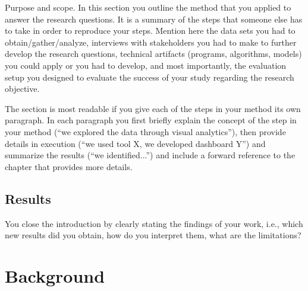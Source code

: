 \documentclass[12pt,a4paper,footinclude=true,twoside,headinclude=true]{report}
\begin{document}
\textsf{Purpose and scope}. In this section you outline the method that you applied to answer the research questions. It is a summary of the steps that someone else has to take in order to reproduce your steps. Mention here the data sets you had to obtain/gather/analyze, interviews with stakeholders you had to make to further develop the research questions, technical artifacts (programs, algorithms, models) you could apply or you had to develop, and most importantly, the evaluation setup you designed to evaluate the success of your study regarding the research objective.

The section is most readable if you give each of the steps in your method its own paragraph. In each paragraph you first briefly explain the concept of the step in your method (``we explored the data through visual analytics''), then provide details in execution (``we used tool X, we developed dashboard Y'') and summarize the results (``we identified...'') and include a forward reference to the chapter that provides more details.

\section{Results}\label{sec:introduction:results}

You close the introduction by clearly stating the findings of your work, i.e., which new results did you obtain, how do you interpret them, what are the limitations?


\chapter{Background}\label{sec:background}
\end{document}
